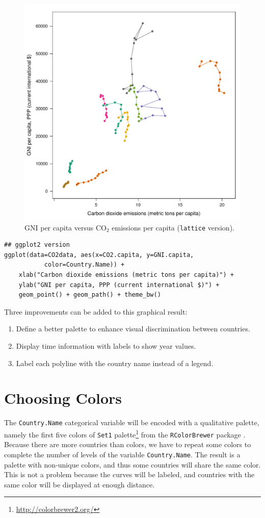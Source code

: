 \documentclass[smallroyalvopaper]{memoir}
\begin{document}
\begin{figure}[htb]
\centering
\includegraphics[width=.9\linewidth]{figs/CO2_GNI.pdf}
\caption{\label{fig:CO2-GNI}GNI per capita versus $\mathrm{CO_2}$ emissions per capita (\texttt{lattice} version).}
\end{figure}

\lstset{language=R,numbers=none}
\begin{lstlisting}
## ggplot2 version
ggplot(data=CO2data, aes(x=CO2.capita, y=GNI.capita,
           color=Country.Name)) +
    xlab("Carbon dioxide emissions (metric tons per capita)") +
    ylab("GNI per capita, PPP (current international $)") +
    geom_point() + geom_path() + theme_bw()
\end{lstlisting}

Three improvements can be added to this graphical result: 
\begin{enumerate}
\item Define a better palette to enhance visual discrimination between
countries.
\item Display time information with labels to show year values.
\item Label each polyline with the country name instead of a legend.
\end{enumerate}
\section{Choosing Colors}
\label{sec-2}
The \texttt{Country.Name} categorical variable will be encoded with a
qualitative palette, namely the first five colors of \texttt{Set1}
palette\footnote{\url{http://colorbrewer2.org/}} from the \texttt{RColorBrewer} package
\cite{Neuwirth2011}. Because there are more countries than colors, we
have to repeat some colors to complete the number of levels of the
variable \texttt{Country.Name}. The result is a palette with non-unique
colors, and thus some countries will share the same color. This is not
a problem because the curves will be labeled, and countries with the
same color will be displayed at enough distance.
\end{document}
